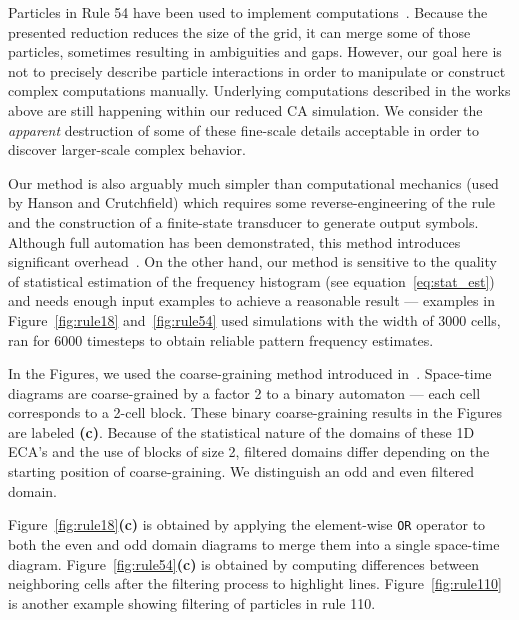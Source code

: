 Particles in Rule 54 have been used to implement
computations~\cite{boccaraParticlelikeStructuresTheir1991,
  pivatoSpectralDomainBoundaries2007,
  martinezCompleteCharacterizationStructure2014}. Because the presented
reduction reduces the size of the grid, it can merge some of those particles,
sometimes resulting in ambiguities and gaps. However, our goal here is not to
precisely describe particle interactions in order to manipulate or construct
complex computations manually. Underlying computations described in the works
above are still happening within our reduced CA simulation. We consider the
\emph{apparent} destruction of some of these fine-scale details acceptable in
order to discover larger-scale complex behavior.

Our method is also arguably much simpler than computational mechanics (used by
Hanson and Crutchfield) which requires some reverse-engineering of the rule and
the construction of a finite-state transducer to generate output symbols.
Although full automation has been demonstrated, this method introduces
significant overhead~\cite{rupeLocalCausalStates2018}. On the other hand, our
method is sensitive to the quality of statistical estimation of the frequency
histogram (see equation~\eqref{eq:stat_est}) and needs enough input examples to
achieve a reasonable result --- examples in Figure~\ref{fig:rule18}
and~\ref{fig:rule54} used simulations with the width of 3000 cells, ran for 6000
timesteps to obtain reliable pattern frequency estimates.

In the Figures, we used the coarse-graining method introduced
in~. Space-time diagrams are coarse-grained by a
factor 2 to a binary automaton --- each cell corresponds to a 2-cell block.
These binary coarse-graining results in the Figures are labeled \textbf{(c)}.
Because of the statistical nature of the domains of these 1D ECA's and the use of
blocks of size 2, filtered domains differ depending on the starting position of
coarse-graining. We distinguish an odd and even filtered domain.

Figure~\ref{fig:rule18}\textbf{(c)} is obtained by applying the element-wise
\texttt{OR} operator to both the even and odd domain diagrams to merge them into
a single space-time diagram. Figure~\ref{fig:rule54}\textbf{(c)} is obtained by
computing differences between neighboring cells after the filtering process to
highlight lines. Figure~\ref{fig:rule110} is another example showing filtering
of particles in rule 110.


